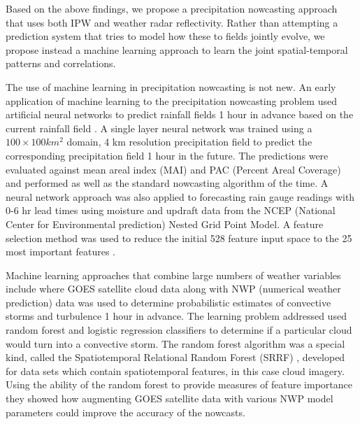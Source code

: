 \documentclass[proposal]{umassthesis}
\begin{document}
Based on the above findings, we propose a precipitation nowcasting approach that uses both IPW and weather radar reflectivity. Rather than attempting a prediction system that tries to model how these to fields jointly evolve, we propose instead a machine learning approach to learn the joint spatial-temporal patterns and correlations.

The use of machine learning in precipitation nowcasting is not new. An early application of machine learning to the precipitation nowcasting problem used artificial neural networks to predict rainfall fields 1 hour in advance based on the current rainfall field \cite{french1992rainfall}. A single layer neural network was trained using a $100 \times 100 km^{2}$ domain, 4 km resolution precipitation field to predict the corresponding precipitation field 1 hour in the future. The predictions were evaluated against mean areal index (MAI) and PAC (Percent Areal Coverage) and performed as well as the standard nowcasting algorithm of the time. A neural network approach was also applied to forecasting rain gauge readings with 0-6 hr lead times using moisture and updraft data from the NCEP (National Center for Environmental prediction) Nested Grid Point Model. A feature selection method was used to reduce the initial 528 feature input space to the 25 most important features \cite{kuligowski1998localized}.

Machine learning approaches that combine large numbers of weather variables include \cite{mecikalski2015probabilistic} where GOES satellite cloud data along with NWP (numerical weather prediction) data was used to determine probabilistic estimates of convective storms and turbulence 1 hour in advance. The learning problem addressed used random forest and logistic regression classifiers to determine if a particular cloud would turn into a convective storm. The random forest algorithm was a special kind, called the Spatiotemporal Relational Random Forest (SRRF) \cite{mcgovern2010understanding}, developed for data sets which contain spatiotemporal features, in this case cloud imagery.  Using the ability of the random forest to provide measures of feature importance they showed how augmenting GOES satellite data with various NWP model parameters could improve the accuracy of the nowcasts.
\end{document}
